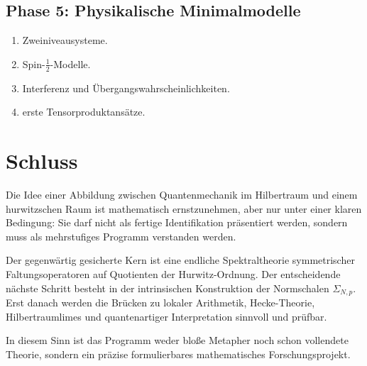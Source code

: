 \documentclass[12pt,a4paper]{article}
\theoremstyle{plain}
\theoremstyle{definition}
\theoremstyle{remark}
\begin{document}
	\subsection*{Phase 5: Physikalische Minimalmodelle}
	\begin{enumerate}
		\item Zweiniveausysteme.
		\item Spin-\(\frac12\)-Modelle.
		\item Interferenz und Übergangswahrscheinlichkeiten.
		\item erste Tensorproduktansätze.
	\end{enumerate}
	
	\section{Schluss}
	
	Die Idee einer Abbildung zwischen Quantenmechanik im Hilbertraum und einem hurwitzschen
	Raum ist mathematisch ernstzunehmen, aber nur unter einer klaren Bedingung:
	Sie darf nicht als fertige Identifikation präsentiert werden, sondern muss als
	mehrstufiges Programm verstanden werden.
	
	Der gegenwärtig gesicherte Kern ist eine endliche Spektraltheorie symmetrischer
	Faltungsoperatoren auf Quotienten der Hurwitz-Ordnung. Der entscheidende nächste
	Schritt besteht in der intrinsischen Konstruktion der Normschalen \(\Sigma_{N,p}\).
	Erst danach werden die Brücken zu lokaler Arithmetik, Hecke-Theorie, Hilbertraumlimes
	und quantenartiger Interpretation sinnvoll und prüfbar.
	
	In diesem Sinn ist das Programm weder bloße Metapher noch schon vollendete Theorie,
	sondern ein präzise formulierbares mathematisches Forschungsprojekt.
	
\end{document}
